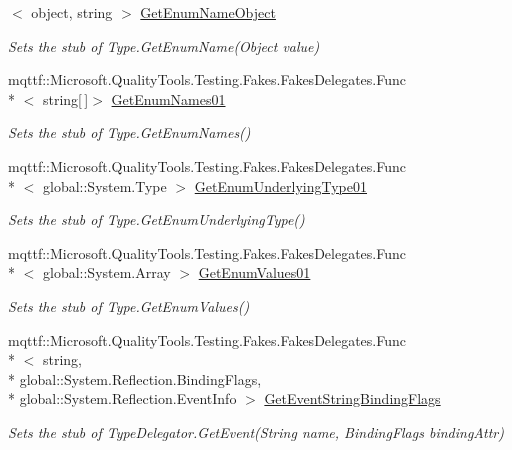 \begin{DoxyCompactItemize}
$<$ object, string $>$ \hyperlink{class_system_1_1_reflection_1_1_fakes_1_1_stub_type_delegator_a49d9d01c03cd10b1c560777e41570011}{Get\-Enum\-Name\-Object}
\begin{DoxyCompactList}\small\item\em Sets the stub of Type.\-Get\-Enum\-Name(\-Object value)\end{DoxyCompactList}\item 
mqttf\-::\-Microsoft.\-Quality\-Tools.\-Testing.\-Fakes.\-Fakes\-Delegates.\-Func\\*
$<$ string\mbox{[}$\,$\mbox{]}$>$ \hyperlink{class_system_1_1_reflection_1_1_fakes_1_1_stub_type_delegator_a472ba24cdff1803f6888aaed115319a8}{Get\-Enum\-Names01}
\begin{DoxyCompactList}\small\item\em Sets the stub of Type.\-Get\-Enum\-Names()\end{DoxyCompactList}\item 
mqttf\-::\-Microsoft.\-Quality\-Tools.\-Testing.\-Fakes.\-Fakes\-Delegates.\-Func\\*
$<$ global\-::\-System.\-Type $>$ \hyperlink{class_system_1_1_reflection_1_1_fakes_1_1_stub_type_delegator_a2ca084ffcc1f87e31e3c88555f5e9ebb}{Get\-Enum\-Underlying\-Type01}
\begin{DoxyCompactList}\small\item\em Sets the stub of Type.\-Get\-Enum\-Underlying\-Type()\end{DoxyCompactList}\item 
mqttf\-::\-Microsoft.\-Quality\-Tools.\-Testing.\-Fakes.\-Fakes\-Delegates.\-Func\\*
$<$ global\-::\-System.\-Array $>$ \hyperlink{class_system_1_1_reflection_1_1_fakes_1_1_stub_type_delegator_af73c117b199485045755603ce52605f1}{Get\-Enum\-Values01}
\begin{DoxyCompactList}\small\item\em Sets the stub of Type.\-Get\-Enum\-Values()\end{DoxyCompactList}\item 
mqttf\-::\-Microsoft.\-Quality\-Tools.\-Testing.\-Fakes.\-Fakes\-Delegates.\-Func\\*
$<$ string, \\*
global\-::\-System.\-Reflection.\-Binding\-Flags, \\*
global\-::\-System.\-Reflection.\-Event\-Info $>$ \hyperlink{class_system_1_1_reflection_1_1_fakes_1_1_stub_type_delegator_a3451b1d90ffc3e447301f4a33344d534}{Get\-Event\-String\-Binding\-Flags}
\begin{DoxyCompactList}\small\item\em Sets the stub of Type\-Delegator.\-Get\-Event(\-String name, Binding\-Flags binding\-Attr)\end{DoxyCompactList}\item 

\end{DoxyCompactItemize}
